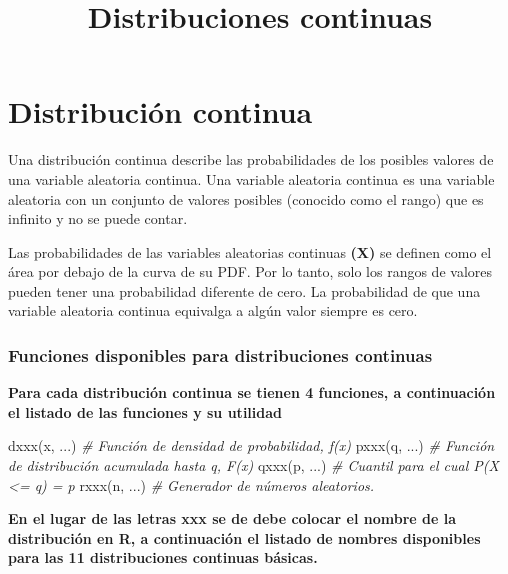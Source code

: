 \documentclass[
]{article}
\title{Distribuciones continuas}
\author{}
\date{\vspace{-2.5em}}
\newenvironment{Shaded}{\begin{snugshade}}{\end{snugshade}}
\newcommand{\CommentTok}[1]{\textcolor[rgb]{0.56,0.35,0.01}{\textit{#1}}}
\newcommand{\FunctionTok}[1]{\textcolor[rgb]{0.00,0.00,0.00}{#1}}
\newcommand{\NormalTok}[1]{#1}
\begin{document}
\maketitle

\hypertarget{distribuciuxf3n-continua}{%
\section{Distribución continua}\label{distribuciuxf3n-continua}}

Una distribución continua describe las probabilidades de los posibles
valores de una variable aleatoria continua. Una variable aleatoria
continua es una variable aleatoria con un conjunto de valores posibles
(conocido como el rango) que es infinito y no se puede contar.

Las probabilidades de las variables aleatorias continuas \textbf{(X)} se
definen como el área por debajo de la curva de su PDF. Por lo tanto,
solo los rangos de valores pueden tener una probabilidad diferente de
cero. La probabilidad de que una variable aleatoria continua equivalga a
algún valor siempre es cero.

\hypertarget{funciones-disponibles-para-distribuciones-continuas}{%
\subsubsection{Funciones disponibles para distribuciones
continuas}\label{funciones-disponibles-para-distribuciones-continuas}}

\textbf{Para cada distribución continua se tienen 4 funciones, a
continuación el listado de las funciones y su utilidad}

\begin{Shaded}
\begin{Highlighting}[]
\FunctionTok{dxxx}\NormalTok{(x, ...)  }\CommentTok{\# Función de densidad de probabilidad, f(x)}
\FunctionTok{pxxx}\NormalTok{(q, ...)  }\CommentTok{\# Función de distribución acumulada hasta q, F(x)}
\FunctionTok{qxxx}\NormalTok{(p, ...)  }\CommentTok{\# Cuantil para el cual P(X \textless{}= q) = p}
\FunctionTok{rxxx}\NormalTok{(n, ...)  }\CommentTok{\# Generador de números aleatorios.}
\end{Highlighting}
\end{Shaded}

\textbf{En el lugar de las letras xxx se de debe colocar el nombre de la
distribución en R, a continuación el listado de nombres disponibles para
las 11 distribuciones continuas básicas.}
\end{document}
